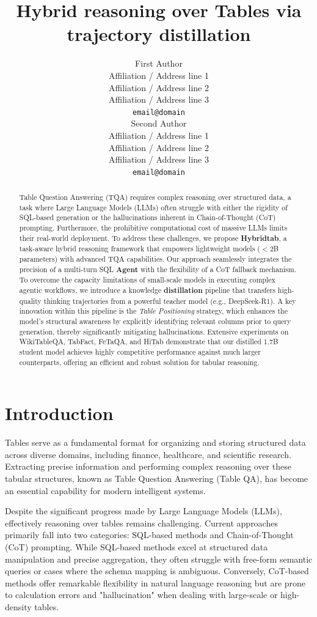 \documentclass[11pt]{article}
\title{Hybrid reasoning over Tables via trajectory distillation}
\author{First Author \\
  Affiliation / Address line 1 \\
  Affiliation / Address line 2 \\
  Affiliation / Address line 3 \\
  \texttt{email@domain} \\\And
  Second Author \\
  Affiliation / Address line 1 \\
  Affiliation / Address line 2 \\
  Affiliation / Address line 3 \\
  \texttt{email@domain} \\}
\begin{document}
\maketitle
\begin{abstract}
Table Question Answering (TQA) requires complex reasoning over structured data, a task where Large Language Models (LLMs) often struggle with either the rigidity of SQL-based generation or the hallucinations inherent in Chain-of-Thought (CoT) prompting. Furthermore, the prohibitive computational cost of massive LLMs limits their real-world deployment. To address these challenges, we propose \textbf{Hybridtab}, a task-aware hybrid reasoning framework that empowers lightweight models ($<$2B parameters) with advanced TQA capabilities. Our approach seamlessly integrates the precision of a multi-turn SQL \textbf{Agent} with the flexibility of a CoT fallback mechanism. To overcome the capacity limitations of small-scale models in executing complex agentic workflows, we introduce a knowledge \textbf{distillation} pipeline that transfers high-quality thinking trajectories from a powerful teacher model (e.g., DeepSeek-R1). A key innovation within this pipeline is the \textit{Table Positioning} strategy, which enhances the model's structural awareness by explicitly identifying relevant columns prior to query generation, thereby significantly mitigating hallucinations. Extensive experiments on WikiTableQA, TabFact, FeTaQA, and HiTab demonstrate that our distilled 1.7B student model achieves highly competitive performance against much larger counterparts, offering an efficient and robust solution for tabular reasoning.
\end{abstract}

\section{Introduction}
Tables serve as a fundamental format for organizing and storing structured data across diverse domains, including finance, healthcare, and scientific research. Extracting precise information and performing complex reasoning over these tabular structures, known as Table Question Answering (Table QA), has become an essential capability for modern intelligent systems. 

Despite the significant progress made by Large Language Models (LLMs), effectively reasoning over tables remains challenging. Current approaches primarily fall into two categories: SQL-based methods and Chain-of-Thought (CoT) prompting. While SQL-based methods excel at structured data manipulation and precise aggregation, they often struggle with free-form semantic queries or cases where the schema mapping is ambiguous. Conversely, CoT-based methods offer remarkable flexibility in natural language reasoning but are prone to calculation errors and "hallucination" when dealing with large-scale or high-density tables.
\end{document}
